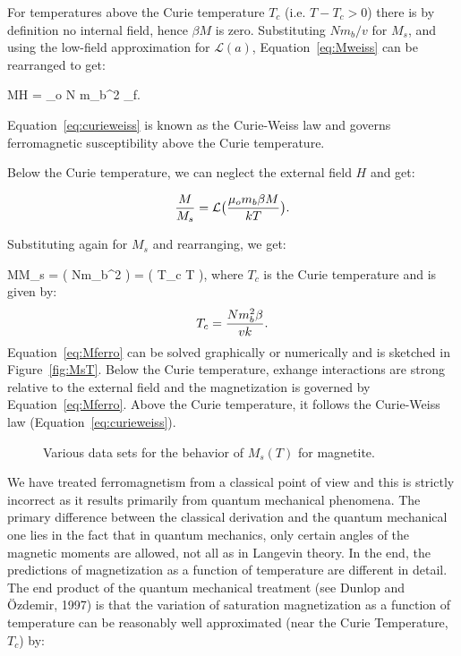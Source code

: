 \noindent For temperatures above the Curie temperature $T_c$ (i.e.
$T-T_c>0$) there is by definition no internal field, hence  $\beta M$  is zero.
Substituting $N m_b/v$ for $M_s$, and using the low-field approximation
for $\mathcal{L} (a)$, Equation~\ref{eq:Mweiss} can 
be rearranged to get:

%
\beq
{M\over H} = { {\mu_o N m_b^2} } \equiv \chi_f.
\label{eq:curieweiss}
\eeq

\noindent
Equation~\ref{eq:curieweiss} is known as the Curie-Weiss law and governs
ferromagnetic susceptibility above the Curie temperature.  

Below the Curie temperature, we can neglect the external field $H$ and 
get:


$$
{M\over {M_s}} = \mathcal{L}  \bigl( {{\mu_o m_b \beta M}\over{kT}}\bigr).
$$ 

\noindent Substituting again for $M_s$ and rearranging, we get:


\beq
{M\over M_s} =  \bigl( {{Nm_b^2 \beta}}
\bigr) =
  \bigl( {T_c \over T}  \bigr),
\label{eq:Mferro}
\eeq
{}%
\noindent where $T_c$ is the Curie temperature and is given by:
$$T_c = { {Nm_b^2 \beta}\over{vk}}.$$
\noindent  
Equation~\ref{eq:Mferro} can be solved graphically or
numerically and is sketched in Figure~\ref{fig:MsT}.  Below the Curie
temperature, exhange interactions are strong relative to the
external field and  the magnetization is
governed by Equation~\ref{eq:Mferro}. Above the Curie temperature, it
follows the Curie-Weiss law (Equation~\ref{eq:curieweiss}).  

\begin{figure}[htb]
\epsfxsize 13cm
\centering {}
\caption{Various data sets for  the behavior of $M_s(T)$ for magnetite.    }
\label{fig:curie}
\end{figure}



We have treated ferromagnetism from a classical point of view and this is strictly incorrect as it results primarily from quantum mechanical phenomena.  The primary difference  between the classical derivation and the quantum mechanical one lies in the fact that in quantum mechanics, only certain angles of the magnetic moments are allowed, not all as in Langevin theory.  In the end, the predictions of magnetization as a function of temperature are different in detail.   The end product of the quantum mechanical treatment 
(see Dunlop and \"Ozdemir, 1997) \nocite{dunlop97} is that the variation of 
saturation magnetization as a function of temperature can be reasonably well approximated (near the
 Curie Temperature, $T_c$) by:

